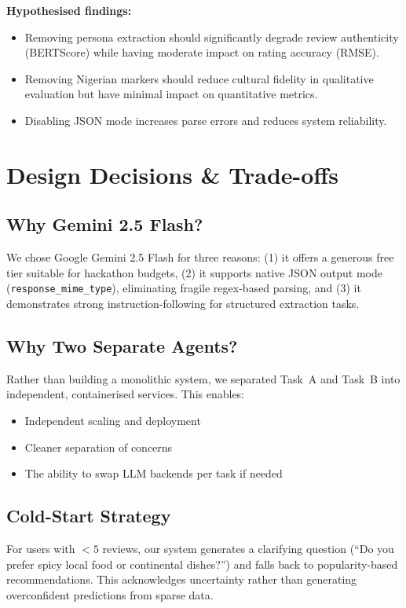 \documentclass[11pt, a4paper]{article}
\begin{document}
\textbf{Hypothesised findings:}
\begin{itemize}[leftmargin=2em]
    \item Removing persona extraction should significantly degrade review authenticity (BERTScore) while having moderate impact on rating accuracy (RMSE).
    \item Removing Nigerian markers should reduce cultural fidelity in qualitative evaluation but have minimal impact on quantitative metrics.
    \item Disabling JSON mode increases parse errors and reduces system reliability.
\end{itemize}

\section{Design Decisions \& Trade-offs}

\subsection{Why Gemini 2.5 Flash?}
We chose Google Gemini 2.5 Flash for three reasons: (1) it offers a generous free tier suitable for hackathon budgets, (2) it supports native JSON output mode (\texttt{response\_mime\_type}), eliminating fragile regex-based parsing, and (3) it demonstrates strong instruction-following for structured extraction tasks.

\subsection{Why Two Separate Agents?}
Rather than building a monolithic system, we separated Task~A and Task~B into independent, containerised services. This enables:
\begin{itemize}[leftmargin=2em]
    \item Independent scaling and deployment
    \item Cleaner separation of concerns
    \item The ability to swap LLM backends per task if needed
\end{itemize}

\subsection{Cold-Start Strategy}
For users with $<5$ reviews, our system generates a clarifying question (``Do you prefer spicy local food or continental dishes?'') and falls back to popularity-based recommendations. This acknowledges uncertainty rather than generating overconfident predictions from sparse data.
\end{document}
